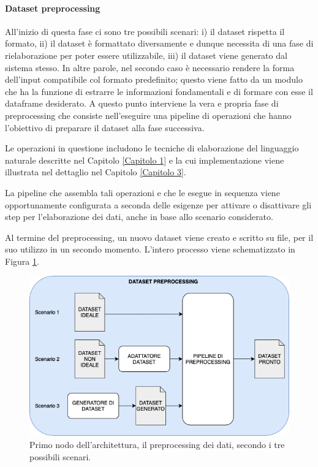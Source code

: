 \documentclass[12pt]{report}
\theoremstyle{definition}
\begin{document}
\paragraph{Dataset preprocessing} All'inizio di questa fase ci sono tre possibili scenari: i) il dataset rispetta il formato, ii) il dataset è formattato diversamente e dunque necessita di una fase di rielaborazione per poter essere utilizzabile, iii) il dataset viene generato dal sistema stesso.
In altre parole, nel secondo caso è necessario rendere la forma dell'input compatibile col formato predefinito; questo viene fatto da un modulo che ha la funzione di estrarre le informazioni fondamentali e di formare con esse il dataframe desiderato.
A questo punto interviene la vera e propria fase di preprocessing che consiste nell'eseguire una pipeline di operazioni che hanno l'obiettivo di preparare il dataset alla fase successiva.

Le operazioni in questione includono le tecniche di elaborazione del linguaggio naturale descritte nel Capitolo \ref{Capitolo 1} e la cui implementazione viene illustrata nel dettaglio nel Capitolo \ref{Capitolo 3}.

La pipeline che assembla tali operazioni e che le esegue in sequenza viene opportunamente configurata a seconda delle esigenze per attivare o disattivare gli step per l'elaborazione dei dati, anche in base allo scenario considerato.

Al termine del preprocessing, un nuovo dataset viene creato e scritto su file, per il suo utilizzo in un secondo momento. L'intero processo viene schematizzato in Figura \ref{preprocessmodule}.

\begin{figure}
    \centering
    \includegraphics[scale=0.6]{images/preprocessingmodule.png}
    \caption{Primo nodo dell'architettura, il preprocessing dei dati, secondo i tre possibili scenari.}
    \label{preprocessmodule}
\end{figure}
\end{document}
